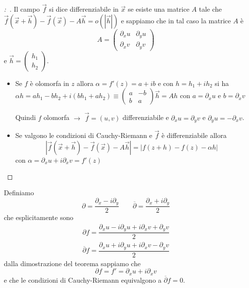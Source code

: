 \documentclass[11pt,a4paper,twoside]{book}
\newenvironment{dimo}[1][\proofname]{
	\begin{tcolorbox}[
	breakable, 
	enhanced, 
	interior hidden, 
	frame hidden, 
	borderline west = {1pt}{0pt}{gray}, 
	top=0pt, bottom=0pt, left=0pt]
\begin{proof}[#1:~]
}
{
\end{proof}
\end{tcolorbox}
}
\theoremstyle{esss}
\theoremstyle{dotless}
\numberwithin{equation}{section} %
\begin{document}
\begin{dimo}
Il campo $\vec{f}$ si dice differenziabile in $\vec{x}$ se esiste una matrice $A$ tale che $\vec{f}(\vec{x}+\vec{h})-\vec{f}(\vec{x})-A\vec{h}=o(|\vec{h}|)$ e sappiamo che in tal caso la matrice $A$ è \[
A=\left(\begin{array}{cc} \partial_x u & \partial_y u \\ \partial_x v & \partial_y v\end{array}\right)
\] e $\vec{h}=\left( \begin{array}{c}h_1 \\ h_2\end{array}\right)$.
\begin{itemize}
\item Se $f$ è olomorfa in $z$ allora $\alpha=f'(z)=a+ib$ e con $h=h_1+ih_2$ si ha $\alpha h=ah_1-bh_2+i(bh_1+ah_2)\equiv \left( \begin{array}{cc}a & -b \\ b & a\end{array}\right) \vec{h}=A h$ con $a=\partial_x u$ e $b= \partial_x v$  

Quindi $f$ olomorfa $\rightarrow$ $\vec{f}=(u,v)$  differenziabile e $\partial_x u=\partial_y v$ e $\partial_y u=-\partial_x v$.
\item Se valgono le condizioni di Cauchy-Riemann e $\vec{f}$ è differenziabile allora
\[
|\vec{f}(\vec{x}+\vec{h})-\vec{f}(\vec{x})-A\vec{h}|=|f(z+h)-f(z)-\alpha h| 
\]
con $\alpha=\partial_x u + i\partial_x v=f'(z)$ \qedhere
\end{itemize}
\end{dimo}


 


Definiamo 
\[ \partial=\dfrac{\partial_x-i\partial_y}{2} \qquad \overline{\partial}=\dfrac{\partial_x+i\partial_y}{2}
\]
che esplicitamente  sono
\begin{gather*}
\partial f = \dfrac{\partial_x u - i \partial_y u  +i\partial_x v +\partial_y v }{2} \\
\overline{\partial} f = \dfrac{\partial_x u + i \partial_y u  +i\partial_x v -\partial_y v }{2}
\end{gather*}
dalla dimostrazione del teorema sappiamo che 
\begin{equation}\label{eqDerivataComplessaEsplicita}
\partial f =f'=\partial_x u+i\partial_x v
\end{equation}
e che le condizioni di Cauchy-Riemann equivalgono a $\overline{\partial}f=0$.
\end{document}
